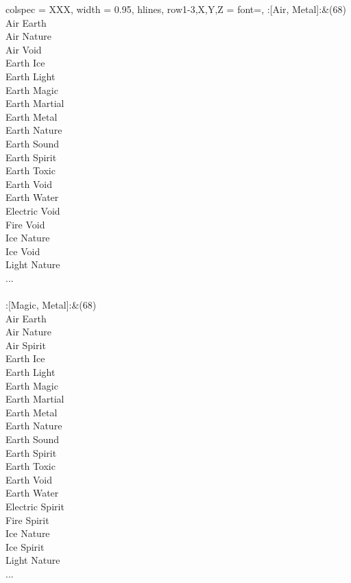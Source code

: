 \begin{longtblr}[
	caption = {2v2 Defending Weak},
	label = {2v2-Defending-Weak},
]{
	colspec = {XXX}, width = 0.95\linewidth,
	hlines,
	row{1-3,X,Y,Z} = {font=\bfseries},
}
	:[Air, Metal]:&{(68)\\
	Air Earth \\
	Air Nature \\
	Air Void \\
	Earth Ice \\
	Earth Light \\
	Earth Magic \\
	Earth Martial \\
	Earth Metal \\
	Earth Nature \\
	Earth Sound \\
	Earth Spirit \\
	Earth Toxic \\
	Earth Void \\
	Earth Water \\
	Electric Void \\
	Fire Void \\
	Ice Nature \\
	Ice Void \\
	Light Nature \\
	...\\
	}\\

	:[Magic, Metal]:&{(68)\\
	Air Earth \\
	Air Nature \\
	Air Spirit \\
	Earth Ice \\
	Earth Light \\
	Earth Magic \\
	Earth Martial \\
	Earth Metal \\
	Earth Nature \\
	Earth Sound \\
	Earth Spirit \\
	Earth Toxic \\
	Earth Void \\
	Earth Water \\
	Electric Spirit \\
	Fire Spirit \\
	Ice Nature \\
	Ice Spirit \\
	Light Nature \\
	...\\
	}\\


\end{longtblr}
